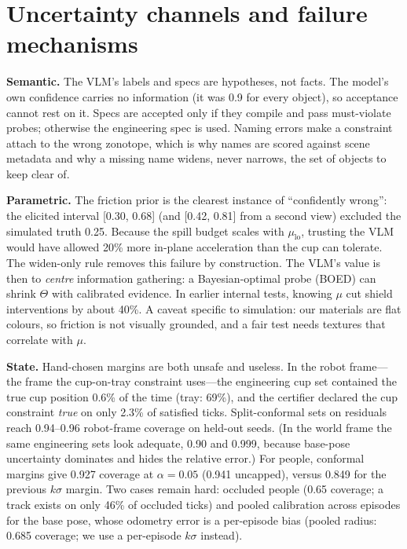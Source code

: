 \documentclass[10pt,twocolumn,letterpaper]{article}
\begin{document}
\section{Uncertainty channels and failure mechanisms}\label{sec:uq}

\textbf{Semantic.} The VLM's labels and specs are hypotheses, not facts. The model's own confidence carries no information (it was 0.9 for
every object), so acceptance cannot rest on it. Specs are accepted only if they compile and pass must-violate probes; otherwise the
engineering spec is used. Naming errors make a constraint attach to the wrong zonotope, which is why names are scored against scene metadata
and why a missing name widens, never narrows, the set of objects to keep clear of.

\textbf{Parametric.} The friction prior is the clearest instance of ``confidently wrong'': the elicited interval [0.30, 0.68] (and
[0.42, 0.81] from a second view) excluded the simulated truth 0.25. Because the spill budget scales with $\mu_{\mathrm{lo}}$, trusting the
VLM would have allowed 20\% more in-plane acceleration than the cup can tolerate. The widen-only rule removes this failure by
construction. The VLM's value is then to \emph{centre} information gathering: a Bayesian-optimal probe (BOED) can shrink $\Theta$ with
calibrated evidence. In earlier internal tests, knowing $\mu$ cut shield interventions by about 40\%. A caveat specific to simulation:
our materials are flat colours, so friction is not visually grounded, and a fair test needs textures that correlate with $\mu$.

\textbf{State.} Hand-chosen margins are both unsafe and useless. In the robot frame---the frame the cup-on-tray constraint uses---the engineering cup set contained the true cup position 0.6\% of the time (tray: 69\%),
and the certifier declared the cup constraint \emph{true} on only 2.3\% of satisfied ticks. Split-conformal sets on residuals reach
0.94--0.96 robot-frame coverage on held-out seeds. (In the world frame the same engineering sets look adequate, 0.90 and 0.999, because base-pose uncertainty dominates and hides the relative error.) For people, conformal margins give 0.927 coverage at $\alpha{=}0.05$ (0.941 uncapped), versus
0.849 for the previous $k\sigma$ margin. Two cases remain hard: occluded people (0.65 coverage; a track exists on only 46\% of occluded
ticks) and pooled calibration across episodes for the base pose, whose odometry error is a per-episode bias (pooled radius: 0.685 coverage;
we use a per-episode $k\sigma$ instead).
\end{document}
